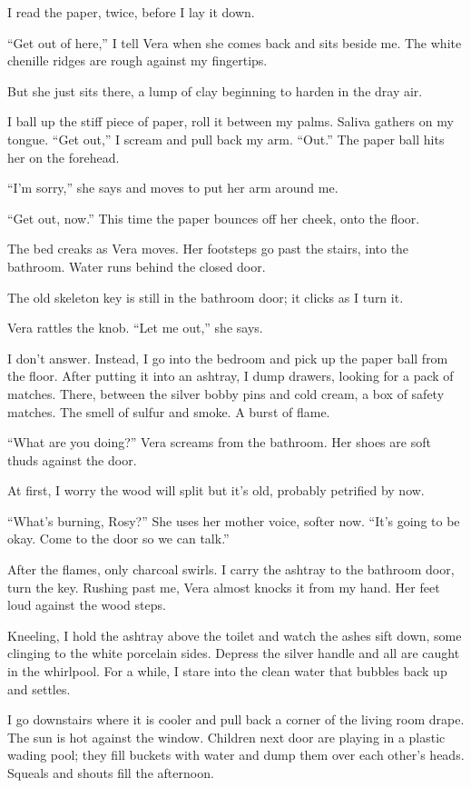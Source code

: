 \documentclass[
]{article}
\begin{document}
I read the paper, twice, before I lay it down.

``Get out of here,'' I tell Vera when she comes back and sits beside me.
The white chenille ridges are rough against my fingertips.

But she just sits there, a lump of clay beginning to harden in the dray
air.

I ball up the stiff piece of paper, roll it between my palms. Saliva
gathers on my tongue. ``Get out,'' I scream and pull back my arm.
``Out.'' The paper ball hits her on the forehead.

``I'm sorry,'' she says and moves to put her arm around me.

``Get out, now.'' This time the paper bounces off her cheek, onto the
floor.

The bed creaks as Vera moves. Her footsteps go past the stairs, into the
bathroom. Water runs behind the closed door.

The old skeleton key is still in the bathroom door; it clicks as I turn
it.

Vera rattles the knob. ``Let me out,'' she says.

I don't answer. Instead, I go into the bedroom and pick up the paper
ball from the floor. After putting it into an ashtray, I dump drawers,
looking for a pack of matches. There, between the silver bobby pins and
cold cream, a box of safety matches. The smell of sulfur and smoke. A
burst of flame.

``What are you doing?'' Vera screams from the bathroom. Her shoes are
soft thuds against the door.

At first, I worry the wood will split but it's old, probably petrified
by now.

``What's burning, Rosy?'' She uses her mother voice, softer now. ``It's
going to be okay. Come to the door so we can talk.''

After the flames, only charcoal swirls. I carry the ashtray to the
bathroom door, turn the key. Rushing past me, Vera almost knocks it from
my hand. Her feet loud against the wood steps.

Kneeling, I hold the ashtray above the toilet and watch the ashes sift
down, some clinging to the white porcelain sides. Depress the silver
handle and all are caught in the whirlpool. For a while, I stare into
the clean water that bubbles back up and settles.

I go downstairs where it is cooler and pull back a corner of the living
room drape. The sun is hot against the window. Children next door are
playing in a plastic wading pool; they fill buckets with water and dump
them over each other's heads. Squeals and shouts fill the afternoon.
\end{document}
